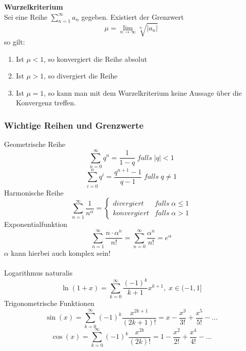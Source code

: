 \documentclass[a4paper,twocolumn,10pt]{article}
\begin{document}
\textbf{Wurzelkriterium}\\
Sei eine Reihe $\sum\limits_{n=1}^{\infty}a_n$ gegeben. Existiert der Grenzwert
\begin{equation*}
\mu =\lim\limits_{n\rightarrow\infty}\sqrt[n]{|a_n|}
\end{equation*}
so gilt:
\begin{enumerate}
\item Ist $\mu<1$, so konvergiert die Reihe absolut
\item Ist $\mu>1$, so divergiert die Reihe
\item Ist $\mu=1$, so kann man mit dem Wurzelkriterium keine Aussage über die Konvergenz treffen.
\end{enumerate}

\subsubsection{Wichtige Reihen und Grenzwerte}
Geometrische Reihe
\begin{equation*}
\sum\limits_{n=0}^{\infty}q^n=\frac{1}{1-q}\;falls\;|q|<1
\end{equation*}
\begin{equation*}
\sum\limits_{i=0}^{n}q^i=\frac{q^{n+1}-1}{q-1}\;falls\;q\neq 1
\end{equation*}
Harmonische Reihe
\begin{equation*}
\sum\limits_{n=1}^{\infty}\frac{1}{n^{\alpha}}=\begin{cases}divergiert & falls\;\alpha \leq 1 \\ konvergiert & falls\; \alpha >1\end{cases}
\end{equation*}
Exponentialfunktion
\begin{equation*}
\sum\limits_{n=1}^{\infty}\frac{n\cdot\alpha^n}{n!}=\sum\limits_{n=0}^{\infty}\frac{\alpha^n}{n!}=e^{\alpha}
\end{equation*}
$\alpha$ kann hierbei auch komplex sein!\\\\
Logarithmus naturalis
\begin{equation*}
\ln(1+x)=\sum\limits_{k=0}^{\infty}\frac{(-1)^k}{k+1}x^{k+1},\;x\in (-1,1]
\end{equation*}
Trigonometrische Funktionen
\begin{equation*}
\sin(x)=\sum\limits_{k=0}^{\infty}(-1)^k\frac{x^{2k+1}}{(2k+1)!}=x-\frac{x^3}{3!}+\frac{x^5}{5!}-...
\end{equation*}
\begin{equation*}
\cos(x)=\sum\limits_{k=0}^{\infty}(-1)^k\frac{x^{2k}}{(2k)!}=1-\frac{x^2}{2!}+\frac{x^4}{4!}-...
\end{equation*}
\end{document}
